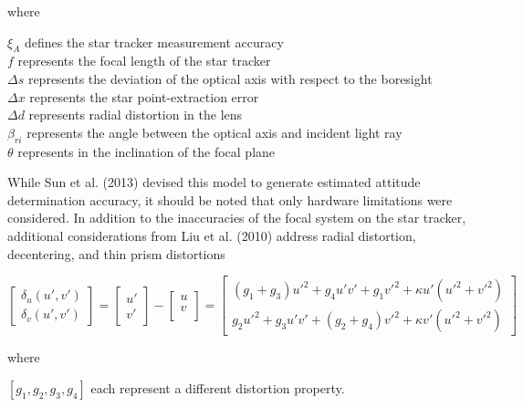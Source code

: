 where
\begin{center}
    $\xi_{A}$ defines the star tracker measurement accuracy\\
    $f$ represents the focal length of the star tracker\\
    $\Delta s$ represents the deviation of the optical axis with respect to the boresight\\
    $\Delta x$ represents the star point-extraction error\\
    $\Delta d$ represents radial distortion in the lens\\
    $\beta_{ri}$ represents the angle between the optical axis and incident light ray\\
    $\theta$ represents in the inclination of the focal plane
\end{center}

\par \qquad While Sun et al. (2013) devised this model to generate estimated attitude determination accuracy, it should be noted that only hardware limitations were considered.
In addition to the inaccuracies of the focal system on the star tracker, additional considerations from Liu et al. (2010) address radial distortion, decentering, and thin prism distortions \cite{novel_approach_for_calibration}

\begin{equation}
    \begin{bmatrix}
        \delta_u(u', v') \\
        \delta_v(u', v')    
    \end{bmatrix}
    =
    \begin{bmatrix}
        u' \\
        v'
    \end{bmatrix}
    -
    \begin{bmatrix}
        u \\
        v \\
    \end{bmatrix}
    =
    \begin{bmatrix}
        (g_1 + g_3)u'^2 + g_4u'v' + g_1v'^2 + \kappa u'(u'^2 + v'^2) \\
        g_2u'^2 + g_3u'v' + (g_2 + g_4)v'^2 + \kappa v'(u'^2 + v'^2)
    \end{bmatrix}
\end{equation}

where 
\begin{center}
    $[g_1, g_2, g_3, g_4]$ each represent a different distortion property.
\end{center}

